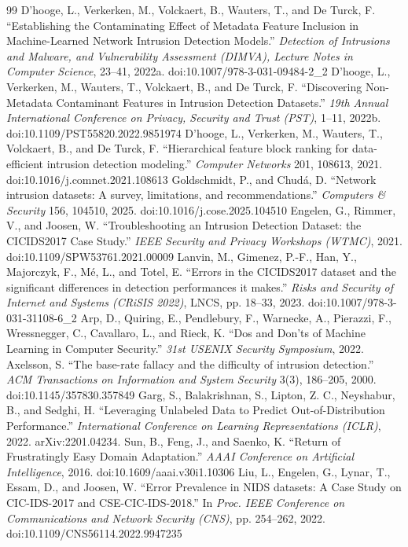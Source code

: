 \documentclass[preprint,12pt,nopreprintline]{elsarticle}
\begin{document}
\begin{thebibliography}{99}
 D'hooge, L., Verkerken, M., Volckaert, B., Wauters, T., and De Turck, F. ``Establishing the Contaminating Effect of Metadata Feature Inclusion in Machine-Learned Network Intrusion Detection Models.'' \emph{Detection of Intrusions and Malware, and Vulnerability Assessment (DIMVA), Lecture Notes in Computer Science}, 23--41, 2022a. doi:10.1007/978-3-031-09484-2\_2
 D'hooge, L., Verkerken, M., Wauters, T., Volckaert, B., and De Turck, F. ``Discovering Non-Metadata Contaminant Features in Intrusion Detection Datasets.'' \emph{19th Annual International Conference on Privacy, Security and Trust (PST)}, 1--11, 2022b. doi:10.1109/PST55820.2022.9851974
 D'hooge, L., Verkerken, M., Wauters, T., Volckaert, B., and De Turck, F. ``Hierarchical feature block ranking for data-efficient intrusion detection modeling.'' \emph{Computer Networks} 201, 108613, 2021. doi:10.1016/j.comnet.2021.108613
 Goldschmidt, P., and Chud\'a, D. ``Network intrusion datasets: A survey, limitations, and recommendations.'' \emph{Computers \& Security} 156, 104510, 2025. doi:10.1016/j.cose.2025.104510
 Engelen, G., Rimmer, V., and Joosen, W. ``Troubleshooting an Intrusion Detection Dataset: the CICIDS2017 Case Study.'' \emph{IEEE Security and Privacy Workshops (WTMC)}, 2021. doi:10.1109/SPW53761.2021.00009
 Lanvin, M., Gimenez, P.-F., Han, Y., Majorczyk, F., M\'e, L., and Totel, E. ``Errors in the CICIDS2017 dataset and the significant differences in detection performances it makes.'' \emph{Risks and Security of Internet and Systems (CRiSIS 2022)}, LNCS, pp. 18--33, 2023. doi:10.1007/978-3-031-31108-6\_2
 Arp, D., Quiring, E., Pendlebury, F., Warnecke, A., Pierazzi, F., Wressnegger, C., Cavallaro, L., and Rieck, K. ``Dos and Don'ts of Machine Learning in Computer Security.'' \emph{31st USENIX Security Symposium}, 2022.
 Axelsson, S. ``The base-rate fallacy and the difficulty of intrusion detection.'' \emph{ACM Transactions on Information and System Security} 3(3), 186--205, 2000. doi:10.1145/357830.357849
 Garg, S., Balakrishnan, S., Lipton, Z. C., Neyshabur, B., and Sedghi, H. ``Leveraging Unlabeled Data to Predict Out-of-Distribution Performance.'' \emph{International Conference on Learning Representations (ICLR)}, 2022. arXiv:2201.04234.
 Sun, B., Feng, J., and Saenko, K. ``Return of Frustratingly Easy Domain Adaptation.'' \emph{AAAI Conference on Artificial Intelligence}, 2016. doi:10.1609/aaai.v30i1.10306
 Liu, L., Engelen, G., Lynar, T., Essam, D., and Joosen, W. ``Error Prevalence in NIDS datasets: A Case Study on CIC-IDS-2017 and CSE-CIC-IDS-2018.'' In \emph{Proc. IEEE Conference on Communications and Network Security (CNS)}, pp. 254--262, 2022. doi:10.1109/CNS56114.2022.9947235

\end{thebibliography}
\end{document}
